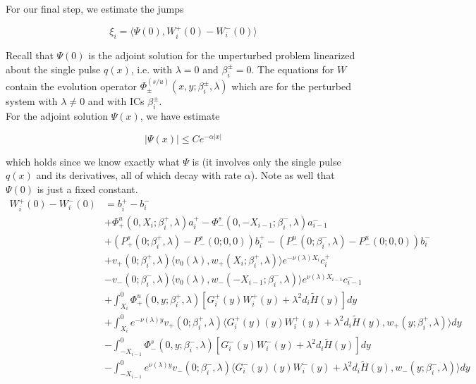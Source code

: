 \documentclass[12pt]{article}
\begin{document}
For our final step, we estimate the jumps

\begin{equation}
\xi_i = \langle \Psi(0), W_i^+(0) - W_i^-(0) \rangle 
\end{equation}

Recall that $\Psi(0)$ is the adjoint solution for the unperturbed problem linearized about the single pulse $q(x)$, i.e. with $\lambda = 0$ and $\beta_i^\pm = 0$. The equations for $W$ contain the evolution operator $\Phi^{(s/u)}_\pm(x, y; \beta_i^\pm, \lambda)$ which are for the perturbed system with $\lambda \neq 0$ and with ICs $\beta_i^\pm$.\\

For the adjoint solution $\Psi(x)$, we have estimate 

\begin{equation}
|\Psi(x)| \leq C e^{-\alpha|x|}
\end{equation}

which holds since we know exactly what $\Psi$ is (it involves only the single pulse $q(x)$ and its derivatives, all of which decay with rate $\alpha$). Note as well that $\Psi(0)$ is just a fixed constant.\\

\begin{align*}
W_i^+(0) - W_i^-(0) &= b_i^+ - b_i^- \\
&+ \Phi^u_+(0, X_i; \beta_i^+, \lambda)a_i^+ - \Phi^s_-(0, -X_{i-1}; \beta_i^-, \lambda)a_{i-1}^- \\
&+(P^s_+(0; \beta_i^+, \lambda) - P^s_-(0; 0, 0))b_i^+  - (P^u_-(0; \beta_i^-, \lambda) - P^u_-(0; 0, 0))b_i^- \\
&+ v_+(0; \beta_i^+, \lambda) \langle v_0(\lambda), w_+(X_i; \beta_i^+, \lambda) \rangle e^{-\nu(\lambda)X_i} c_i^+ \\
&- v_-(0; \beta_i^-, \lambda) \langle v_0(\lambda), w_-(-X_{i-1}; \beta_i^-, \lambda) \rangle e^{\nu(\lambda)X_{i-1}} c_{i-1}^- \\
&+ \int_{X_i}^0 \Phi^u_+(0, y; \beta_i^+, \lambda) [ G_i^+(y)W_i^+(y) + \lambda^2 d_i \tilde{H}(y) ] dy \\
&+ \int_{X_i}^0 e^{-\nu(\lambda)y} v_+(0; \beta_i^+, \lambda) \langle G_i^+(y)(y)W_i^+(y) + \lambda^2 d_i \tilde{H}(y), w_+(y; \beta_i^+, \lambda) \rangle dy \\
&- \int_{-X_{i-1}}^0 \Phi^s_-(0, y; \beta_i^-, \lambda) [ G_i^-(y)W_i^-(y) + \lambda^2 d_i \tilde{H}(y) ] dy \\
&- \int_{-X_{i-1}}^0
e^{\nu(\lambda)y} v_-(0; \beta_i^-, \lambda) \langle G_i^-(y)(y)W_i^-(y) + \lambda^2 d_i \tilde{H}(y), w_-(y; \beta_i^-, \lambda) \rangle dy \\
\end{align*}
\end{document}

